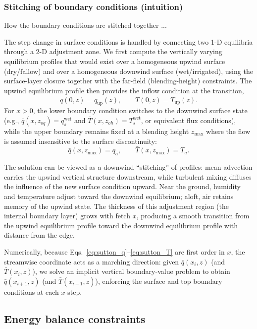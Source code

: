 \documentclass{article}
\begin{document}
    
    \subsubsection*{Stitching of boundary conditions (intuition)}
    How the boundary conditions are stitched together ... 
    
    \noindent
    The step change in surface conditions is handled by connecting two 1-D equilibria through a 2-D adjustment zone.
    We first compute the vertically varying equilibrium profiles that would exist over a homogeneous upwind surface (dry/fallow) and over a homogeneous downwind surface (wet/irrigated), using the surface-layer closure together with the far-field (blending-height) constraints.
    The upwind equilibrium profile then provides the inflow condition at the transition,
    \[
    \bar q(0,z)=q_{\mathrm{up}}(z),
    \qquad
    \bar T(0,z)=T_{\mathrm{up}}(z).
    \]
    For $x>0$, the lower boundary condition switches to the downwind surface state (e.g.,
    $\bar q(x,z_{oq})=q_{s}^{\mathrm{wet}}$ and $\bar T(x,z_{oh})=T_{s}^{\mathrm{wet}}$, or equivalent flux conditions),
    while the upper boundary remains fixed at a blending height $z_{\max}$ where the flow is assumed insensitive to the surface discontinuity:
    \[
    \bar q(x,z_{\max}) = q_a,
    \qquad
    \bar T(x,z_{\max}) = T_a.
    \]
    
    \noindent
    The solution can be viewed as a downwind ``stitching'' of profiles:
    mean advection carries the upwind vertical structure downstream, while turbulent mixing diffuses the influence of the new surface condition upward.
    Near the ground, humidity and temperature adjust toward the downwind equilibrium; aloft, air retains memory of the upwind state.
    The thickness of this adjustment region (the internal boundary layer) grows with fetch $x$, producing a smooth transition from the upwind equilibrium profile toward the downwind equilibrium profile with distance from the edge.
    
    \medskip
    \noindent
    Numerically, because Eqs.~\eqref{eq:sutton_q}--\eqref{eq:sutton_T} are first order in $x$, the streamwise coordinate acts as a marching direction:
    given $\bar q(x_i,z)$ (and $\bar T(x_i,z)$), we solve an implicit vertical boundary-value problem to obtain $\bar q(x_{i+1},z)$ (and $\bar T(x_{i+1},z)$), enforcing the surface and top boundary conditions at each $x$-step.
    
    
    \subsection*{Energy balance constraints}
    \label{sec:energy-balance}
    
\end{document}
